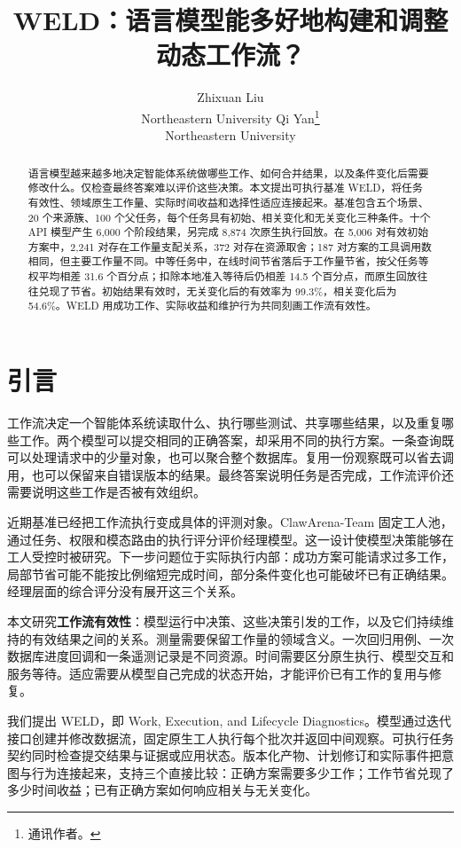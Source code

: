 \documentclass[11pt]{article}
\title{WELD：语言模型能多好地构建和调整动态工作流？}
\author{Zhixuan Liu \\ Northeastern University
\And Qi Yan\thanks{通讯作者。} \\ Northeastern University}
\begin{document}
\maketitle
\begin{abstract}
语言模型越来越多地决定智能体系统做哪些工作、如何合并结果，以及条件变化后需要修改什么。仅检查最终答案难以评价这些决策。本文提出可执行基准 WELD，将任务有效性、领域原生工作量、实际时间收益和选择性适应连接起来。基准包含五个场景、20 个来源簇、100 个父任务，每个任务具有初始、相关变化和无关变化三种条件。十个 API 模型产生 6,000 个阶段结果，另完成 8,874 次原生执行回放。在 5,006 对有效初始方案中，2,241 对存在工作量支配关系，372 对存在资源取舍；187 对方案的工具调用数相同，但主要工作量不同。中等任务中，在线时间节省落后于工作量节省，按父任务等权平均相差 31.6 个百分点；扣除本地准入等待后仍相差 14.5 个百分点，而原生回放往往兑现了节省。初始结果有效时，无关变化后的有效率为 99.3\%，相关变化后为 54.6\%。WELD 用成功工作、实际收益和维护行为共同刻画工作流有效性。
\end{abstract}

\section{引言}
工作流决定一个智能体系统读取什么、执行哪些测试、共享哪些结果，以及重复哪些工作。两个模型可以提交相同的正确答案，却采用不同的执行方案。一条查询既可以处理请求中的少量对象，也可以聚合整个数据库。复用一份观察既可以省去调用，也可以保留来自错误版本的结果。最终答案说明任务是否完成，工作流评价还需要说明这些工作是否被有效组织。

近期基准已经把工作流执行变成具体的评测对象。ClawArena-Team 固定工人池，通过任务、权限和模态路由的执行评分评价经理模型\citep{xiong2026clawarenateam}。这一设计使模型决策能够在工人受控时被研究。下一步问题位于实际执行内部：成功方案可能请求过多工作，局部节省可能不能按比例缩短完成时间，部分条件变化也可能破坏已有正确结果。经理层面的综合评分没有展开这三个关系。

本文研究\textbf{工作流有效性}：模型运行中决策、这些决策引发的工作，以及它们持续维持的有效结果之间的关系。测量需要保留工作量的领域含义。一次回归用例、一次数据库进度回调和一条遥测记录是不同资源。时间需要区分原生执行、模型交互和服务等待。适应需要从模型自己完成的状态开始，才能评价已有工作的复用与修复。

我们提出 WELD，即 Work, Execution, and Lifecycle Diagnostics。模型通过迭代接口创建并修改数据流，固定原生工人执行每个批次并返回中间观察。可执行任务契约同时检查提交结果与证据或应用状态。版本化产物、计划修订和实际事件把意图与行为连接起来，支持三个直接比较：正确方案需要多少工作；工作节省兑现了多少时间收益；已有正确方案如何响应相关与无关变化。
\end{document}
